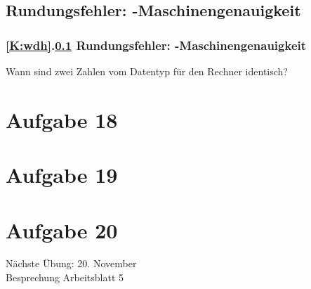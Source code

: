 \documentclass[9pt,german]{beamer}%
\begin{document}
\def\stitle{Rundungsfehler: -Maschinengenauigkeit}
\subsection{\stitle}\label{S:Maschinengenauigkeit1}
\begin{frame}[t]%
 \frametitle{\ref{K:wdh}.\ref{S:Maschinengenauigkeit1} \stitle}
\medskip

Wann sind zwei Zahlen vom Datentyp  f\"ur den Rechner identisch?


\end{frame}


\section{Aufgabe 18}

\section{Aufgabe 19}

\section{Aufgabe 20}


\begin{frame}
\centering
\Huge{}
\vspace{2cm}

{\LARGE
N\"achste \"Ubung: 20. November\\
Besprechung Arbeitsblatt 5
}
\end{frame}


\end{document}
